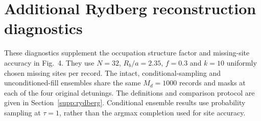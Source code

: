 \documentclass[11pt,a4paper]{article}
\newcommand{\TBD}[1]{\textcolor{red!70!black}{\textsf{[TBD: #1]}}}
\newcommand{\sechead}[2]{\section{#2}}
\newcommand{\subhead}[1]{\subsection*{#1}}
\begin{document}



\sechead{S8}{Additional Rydberg reconstruction diagnostics}
\label{supp:rydberg_results}

These diagnostics supplement the occupation structure factor and
missing-site accuracy in Fig.~4. They use $N=32$, $R_b/a=2.35$,
$f=0.3$ and $k=10$ uniformly chosen missing sites per record.
The intact, conditional-sampling and unconditioned-fill ensembles
share the same $M_d=1000$ records and masks at each of the four original
detunings. The definitions and comparison protocol are given in
Section~\ref{supp:rydberg}. Conditional ensemble results use probability sampling at
$\tau=1$, rather than the argmax completion used for site accuracy.
\end{document}
